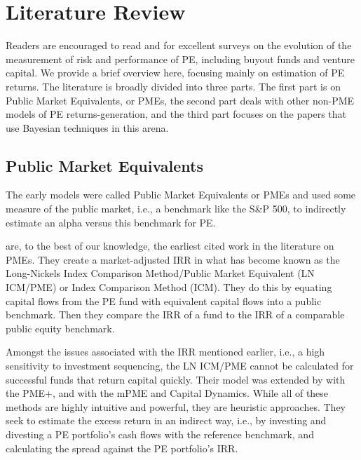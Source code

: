 \documentclass[11pt]{article}
\begin{document}
\section{Literature Review} 
\label{sec:literature}
Readers are encouraged to read \cite{Korteweg2019} and \cite{Kaplan2015} for excellent surveys on the evolution of the measurement of risk and performance of PE, including buyout funds and venture capital. We provide a brief overview here, focusing mainly on estimation of PE returns. The literature is broadly divided into three parts. The first part is on Public Market Equivalents, or PMEs, the second part deals with other non-PME models of PE returns-generation, and the third part focuses on the papers that use Bayesian techniques in this arena.

\subsection{Public Market Equivalents}

The early models were called Public Market Equivalents or PMEs and used some measure of the public market, i.e., a benchmark like the S\&P 500, to indirectly estimate an alpha versus this benchmark for PE. 

\cite{Long1996} are, to the best of our knowledge, the earliest cited work in the literature on PMEs. They create a market-adjusted IRR in what has become known as the Long-Nickels Index Comparison Method/Public Market Equivalent (LN ICM/PME) or Index Comparison Method (ICM). They do this by equating capital flows from the PE fund with equivalent capital flows into a public benchmark. Then they compare the IRR of a fund to the IRR of a comparable public equity benchmark. 


Amongst the issues associated with the IRR mentioned earlier, i.e., a high sensitivity to investment sequencing, the LN ICM/PME cannot be calculated for successful funds that return capital quickly. Their model was extended by \cite{Rouvinez2003} with the PME+, and \cite{Cambridge2013} with the mPME and Capital Dynamics. While all of these methods are highly intuitive and powerful, they are heuristic approaches. They seek to estimate the excess return in an indirect way, i.e., by investing and divesting a PE portfolio’s cash flows with the reference benchmark, and calculating the spread against the PE portfolio's IRR.
\end{document}
